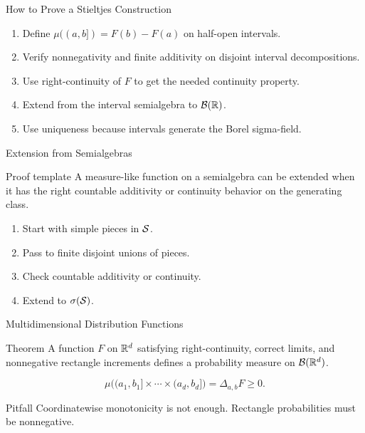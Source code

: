 \begin{frame}{How to Prove a Stieltjes Construction}
  \begin{enumerate}
    \item Define $\mu((a,b])=F(b)-F(a)$ on half-open intervals.
    \item Verify nonnegativity and finite additivity on disjoint interval decompositions.
    \item Use right-continuity of $F$ to get the needed continuity property.
    \item Extend from the interval semialgebra to $\mathcal{B}(\mathbb{R})$.
    \item Use uniqueness because intervals generate the Borel sigma-field.
  \end{enumerate}
\end{frame}

\begin{frame}{Extension from Semialgebras}
  \begin{block}{Proof template}
    A measure-like function on a semialgebra can be extended when it has the right countable additivity or continuity behavior on the generating class.
  \end{block}
  \begin{enumerate}
    \item Start with simple pieces in $\mathcal{S}$.
    \item Pass to finite disjoint unions of pieces.
    \item Check countable additivity or continuity.
    \item Extend to $\sigma(\mathcal{S})$.
  \end{enumerate}
\end{frame}

\begin{frame}{Multidimensional Distribution Functions}
  \begin{block}{Theorem}
    A function $F$ on $\mathbb{R}^d$ satisfying right-continuity, correct limits, and nonnegative rectangle increments defines a probability measure on $\mathcal{B}(\mathbb{R}^d)$.
  \end{block}
  \[
    \mu\bigl((a_1,b_1]\times\cdots\times(a_d,b_d]\bigr)
    =
    \Delta_{a,b}F\ge0.
  \]
  \begin{alertblock}{Pitfall}
    Coordinatewise monotonicity is not enough. Rectangle probabilities must be nonnegative.
  \end{alertblock}
\end{frame}

